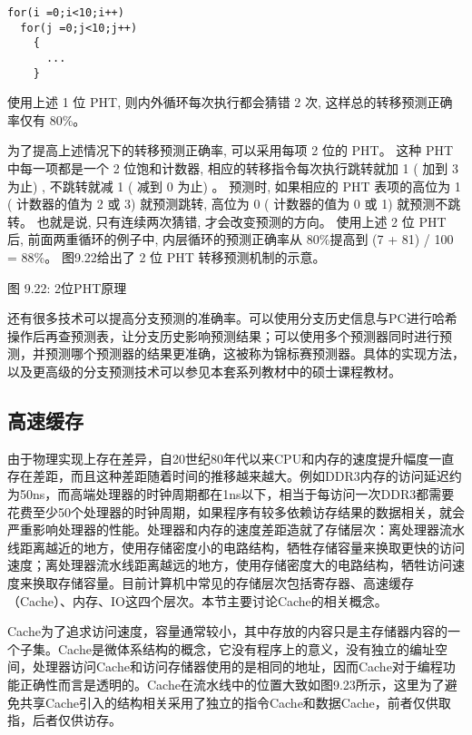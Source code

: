 \documentclass[]{ctexbook}
\begin{document}
\begin{verbatim}
for(i =0;i<10;i++)
  for(j =0;j<10;j++)
    {
      ...
    }
\end{verbatim}

使用上述 1 位 PHT, 则内外循环每次执行都会猜错 2 次, 这样总的转移预测正确率仅有 80\%。

为了提高上述情况下的转移预测正确率, 可以采用每项 2 位的 PHT。 这种 PHT 中每一项都是一个 2 位饱和计数器, 相应的转移指令每次执行跳转就加 1 ( 加到 3 为止) , 不跳转就减 1 ( 减到 0 为止) 。 预测时, 如果相应的 PHT 表项的高位为 1 ( 计数器的值为 2 或 3) 就预测跳转, 高位为 0 ( 计数器的值为 0 或 1) 就预测不跳转。 也就是说, 只有连续两次猜错, 才会改变预测的方向。 使用上述 2 位 PHT 后, 前面两重循环的例子中, 内层循环的预测正确率从 80\%提高到 (7 + 81) / 100 = 88\%。 图9.22给出了 2 位 PHT 转移预测机制的示意。

图 9.22: 2位PHT原理

还有很多技术可以提高分支预测的准确率。可以使用分支历史信息与PC进行哈希操作后再查预测表，让分支历史影响预测结果；可以使用多个预测器同时进行预测，并预测哪个预测器的结果更准确，这被称为锦标赛预测器。具体的实现方法，以及更高级的分支预测技术可以参见本套系列教材中的硕士课程教材。

\hypertarget{ux9ad8ux901fux7f13ux5b58}{%
\subsection{高速缓存}\label{ux9ad8ux901fux7f13ux5b58}}

由于物理实现上存在差异，自20世纪80年代以来CPU和内存的速度提升幅度一直存在差距，而且这种差距随着时间的推移越来越大。例如DDR3内存的访问延迟约为50ns，而高端处理器的时钟周期都在1ns以下，相当于每访问一次DDR3都需要花费至少50个处理器的时钟周期，如果程序有较多依赖访存结果的数据相关，就会严重影响处理器的性能。处理器和内存的速度差距造就了存储层次：离处理器流水线距离越近的地方，使用存储密度小的电路结构，牺牲存储容量来换取更快的访问速度；离处理器流水线距离越远的地方，使用存储密度大的电路结构，牺牲访问速度来换取存储容量。目前计算机中常见的存储层次包括寄存器、高速缓存（Cache）、内存、IO这四个层次。本节主要讨论Cache的相关概念。

Cache为了追求访问速度，容量通常较小，其中存放的内容只是主存储器内容的一个子集。Cache是微体系结构的概念，它没有程序上的意义，没有独立的编址空间，处理器访问Cache和访问存储器使用的是相同的地址，因而Cache对于编程功能正确性而言是透明的。Cache在流水线中的位置大致如图9.23所示，这里为了避免共享Cache引入的结构相关采用了独立的指令Cache和数据Cache，前者仅供取指，后者仅供访存。
\end{document}
